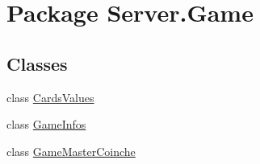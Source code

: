 \hypertarget{namespaceServer_1_1Game}{}\section{Package Server.\+Game}
\label{namespaceServer_1_1Game}
\subsection*{Classes}
\begin{DoxyCompactItemize}
\item 
class \mbox{\hyperlink{classServer_1_1Game_1_1CardsValues}{Cards\+Values}}
\item 
class \mbox{\hyperlink{classServer_1_1Game_1_1GameInfos}{Game\+Infos}}
\item 
class \mbox{\hyperlink{classServer_1_1Game_1_1GameMasterCoinche}{Game\+Master\+Coinche}}
\end{DoxyCompactItemize}
